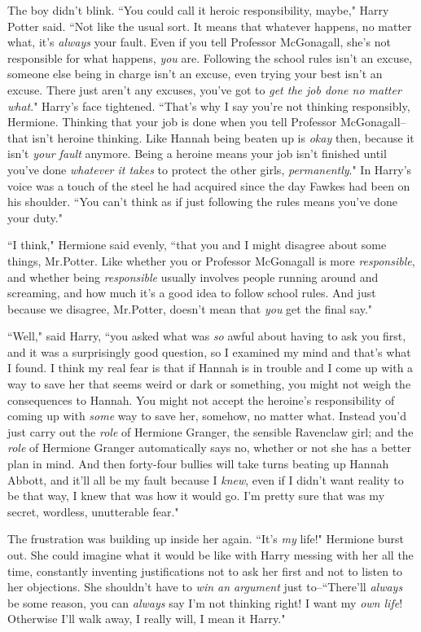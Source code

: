 The boy didn't blink. ``You could call it heroic responsibility, maybe," Harry Potter said. ``Not like the usual sort. It means that whatever happens, no matter what, it's \emph{always} your fault. Even if you tell Professor McGonagall, she's not responsible for what happens, \emph{you} are. Following the school rules isn't an excuse, someone else being in charge isn't an excuse, even trying your best isn't an excuse. There just aren't any excuses, you've got to \emph{get the job done no matter what}." Harry's face tightened. ``That's why I say you're not thinking responsibly, Hermione. Thinking that your job is done when you tell Professor McGonagall\---that isn't heroine thinking. Like Hannah being beaten up is \emph{okay} then, because it isn't \emph{your fault} anymore. Being a heroine means your job isn't finished until you've done \emph{whatever it takes} to protect the other girls, \emph{permanently}." In Harry's voice was a touch of the steel he had acquired since the day Fawkes had been on his shoulder. ``You can't think as if just following the rules means you've done your duty."

``I think," Hermione said evenly, ``that you and I might disagree about some things, Mr.\?Potter. Like whether you or Professor McGonagall is more \emph{responsible}, and whether being \emph{responsible} usually involves people running around and screaming, and how much it's a good idea to follow school rules. And just because we disagree, Mr.\?Potter, doesn't mean that \emph{you} get the final say."

``Well," said Harry, ``you asked what was \emph{so} awful about having to ask you first, and it was a surprisingly good question, so I examined my mind and that's what I found. I think my real fear is that if Hannah is in trouble and I come up with a way to save her that seems weird or dark or something, you might not weigh the consequences to Hannah. You might not accept the heroine's responsibility of coming up with \emph{some} way to save her, somehow, no matter what. Instead you'd just carry out the \emph{role} of Hermione Granger, the sensible Ravenclaw girl; and the \emph{role} of Hermione Granger automatically says no, whether or not she has a better plan in mind. And then forty-four bullies will take turns beating up Hannah Abbott, and it'll all be my fault because I \emph{knew}, even if I didn't want reality to be that way, I knew that was how it would go. I'm pretty sure that was my secret, wordless, unutterable fear."

The frustration was building up inside her again. ``It's \emph{my} life!" Hermione burst out. She could imagine what it would be like with Harry messing with her all the time, constantly inventing justifications not to ask her first and not to listen to her objections. She shouldn't have to \emph{win an argument} just to\---``There'll \emph{always} be some reason, you can \emph{always} say I'm not thinking right! I want my \emph{own life}! Otherwise I'll walk away, I really will, I mean it Harry."

